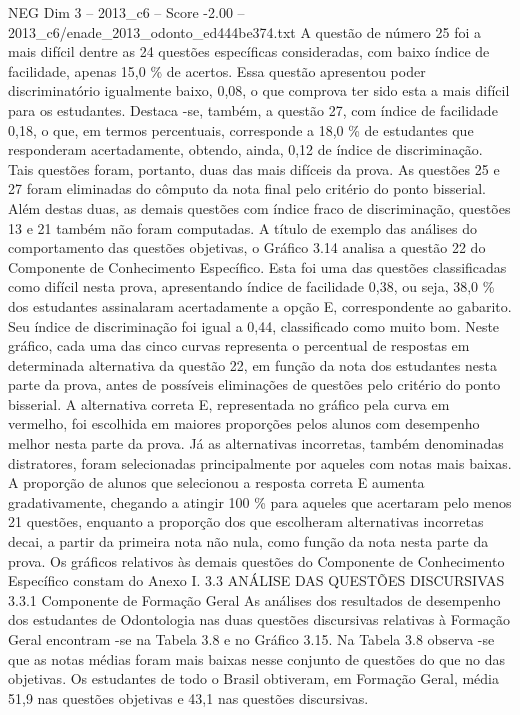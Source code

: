 \begin{textsample}{NEG Dim 3 – 2013\_c6 – Score -2.00 – 2013\_c6/enade\_2013\_odonto\_ed444be374.txt}
A questão de número 25 foi a mais difícil dentre as 24 questões específicas consideradas, com baixo índice de facilidade, apenas 15,0 \% de acertos.
Essa questão apresentou poder discriminatório igualmente baixo, 0,08, o que comprova ter sido esta a mais difícil para os estudantes.
Destaca -se, também, a questão 27, com índice de facilidade 0,18, o que, em termos percentuais, corresponde a 18,0 \% de estudantes que responderam acertadamente, obtendo, ainda, 0,12 de índice de discriminação.
Tais questões foram, portanto, duas das mais difíceis da prova.
As questões 25 e 27 foram eliminadas do cômputo da nota final pelo critério do ponto bisserial.
Além destas duas, as demais questões com índice fraco de discriminação, questões 13 e 21 também não foram computadas.
A título de exemplo das análises do comportamento das questões objetivas, o Gráfico 3.14 analisa a questão 22 do Componente de Conhecimento Específico.
Esta foi uma das questões classificadas como difícil nesta prova, apresentando índice de facilidade 0,38, ou seja, 38,0 \% dos estudantes assinalaram acertadamente a opção E, correspondente ao gabarito.
Seu índice de discriminação foi igual a 0,44, classificado como muito bom.
Neste gráfico, cada uma das cinco curvas representa o percentual de respostas em determinada alternativa da questão 22, em função da nota dos estudantes nesta parte da prova, antes de possíveis eliminações de questões pelo critério do ponto bisserial.
A alternativa correta E, representada no gráfico pela curva em vermelho, foi escolhida em maiores proporções pelos alunos com desempenho melhor nesta parte da prova.
Já as alternativas incorretas, também denominadas distratores, foram selecionadas principalmente por aqueles com notas mais baixas.
A proporção de alunos que selecionou a resposta correta E aumenta gradativamente, chegando a atingir 100 \% para aqueles que acertaram pelo menos 21 questões, enquanto a proporção dos que escolheram alternativas incorretas decai, a partir da primeira nota não nula, como função da nota nesta parte da prova.
Os gráficos relativos às demais questões do Componente de Conhecimento Específico constam do Anexo I. 3.3 ANÁLISE DAS QUESTÕES DISCURSIVAS 3.3.1 Componente de Formação Geral As análises dos resultados de desempenho dos estudantes de Odontologia nas duas questões discursivas relativas à Formação Geral encontram -se na Tabela 3.8 e no Gráfico 3.15.
Na Tabela 3.8 observa -se que as notas médias foram mais baixas nesse conjunto de questões do que no das objetivas.
Os estudantes de todo o Brasil obtiveram, em Formação Geral, média 51,9 nas questões objetivas e 43,1 nas questões discursivas.

\end{textsample}

